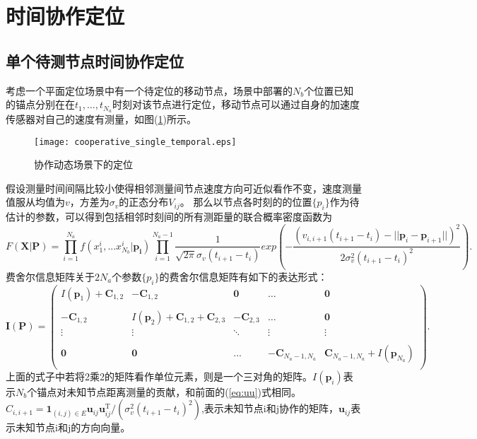 \section[时间协作定位]{时间协作定位}\label{section:temporal_cooperative_localization}

\subsection{单个待测节点时间协作定位}

考虑一个平面定位场景中有一个待定位的移动节点，场景中部署的$N_b$个位置已知的锚点分别在在$t_1,\dots,t_{N_a}$时刻对该节点进行定位，移动节点可以通过自身的加速度传感器对自己的速度有测量，如图(\ref{fig:cooperative_single_temporal})所示。
        \begin{figure}
          \centering
          \texttt{[image: cooperative\_single\_temporal.eps]}
          \caption{协作动态场景下的定位}\label{fig:cooperative_single_temporal}
        \end{figure}

假设测量时间间隔比较小使得相邻测量间节点速度方向可近似看作不变，速度测量值服从均值为$v$，方差为$\sigma_{v}$的正态分布$V_{ij}$。
那么以节点各时刻的的位置$\{p_i\}$作为待估计的参数，可以得到包括相邻时刻间的所有测距量的联合概率密度函数为
\begin{equation}
F(\bm{X}|\bm{P})=\prod_{i=1}^{N_a} f(x^i_1,...x^{i}_{N_b}|\bm{p_i})
\prod_{i=1}^{N_a-1}\frac{1}{\sqrt{2\pi}\sigma_v(t_{i+1}-t_i)}
exp\left(-\frac{(v_{i,i+1}(t_{i+1}-t_i)-||\bm{p}_i-\bm{p}_{i+1}||)^2}{2\sigma_v^2(t_{i+1}-t_i)^2}\right).
\end{equation}
费舍尔信息矩阵关于$2N_a$个参数$\{p_i\}$的费舍尔信息矩阵有如下的表达形式：
\begin{equation}\label{eq:time_cooperation_matrix}
\bm{I}(\bm{P})=
\left(
\begin{array}{ccccc}
I(\bm{p}_1)+\bm{C}_{1,2}&-\bm{C}_{1,2}&\bm{0}&\dots&\bm{0}\\
&&&&\\
-\bm{C}_{1,2} & I(\bm{p}_2)+\bm{C}_{1,2}+\bm{C}_{2,3}&-\bm{C}_{2,3}&\dots&\bm{0}\\
\vdots &\vdots&\ddots &\vdots&\vdots\\
&&&&\\
\bm{0}&\bm{0}&...& -\bm{C}_{N_a-1,N_a}&\bm{C}_{N_a-1,N_a}+I(\bm{p}_{N_a})\\
\end{array}
\right).
\end{equation}
上面的式子中若将2乘2的矩阵看作单位元素，则是一个三对角的矩阵。$I(\bm{p}_i)$表示$N_b$个锚点对未知节点距离测量的贡献，和前面的(\ref{eq:uu})式相同。$C_{i,i+1}=\bm{1}_{(i,j)\in E}\bm{u}_{ij}\bm{u}_{ij}^{\textrm{T}} /(\sigma_v^2(t_{i+1}-t_i)^2)$,表示未知节点i和j协作的矩阵，$\bm{u}_{ij}$表示未知节点i和j的方向向量。

